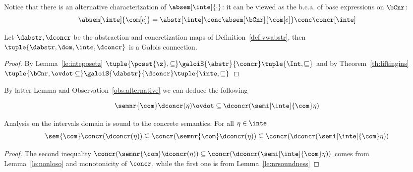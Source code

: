 \begin{observation}\label{obs:alternative}
  Notice that there is an alternative characterization of
  \(\absem[\inte]{\cdot}\): it can be viewed as the b.c.a. of base
  expressions on \(\bCnr\):
  \begin{equation*}
    \absem[\inte]{\com[e]} = \abstr[\inte] \conc \absem[\bCnr]{\com[e]} \conc \concr[\inte]
  \end{equation*}
\end{observation}

\begin{lemma}
  Let \(\dabstr, \dconcr\) be the abstraction and concretization maps
  of Definition~\ref{def:vwabstr}, then
  \(\tuple{\dabstr, \dom, \inte, \dconcr}\) is a Galois connection.
\end{lemma}

\begin{proof}
  By Lemma~\ref{le:inteposetz}
  \(\tuple{\poset{\z}, \subseteq} \galoiS{\abstr}{\concr} \tuple{\Int,
    \sqsubseteq}\) and by Theorem~\ref{th:liftingins}
  \(\tuple{\bCnr, \ovdot\subseteq} \galoiS{\dabstr}{\dconcr}
  \tuple{\inte, \sqsubseteq}\)
\end{proof}

By latter Lemma and Observation~\ref{obs:alternative} we can deduce
the following

\begin{lemma}\label{le:nonloso}
  \begin{equation*}
    \semnr{\com}\dconcr(\eta) \ovdot\subseteq \dconcr(\semi[\inte]{\com}\eta)
  \end{equation*}
\end{lemma}

\begin{observation}
  Analysis on the intervals domain is sound to the concrete
  semantics. For all \(\eta\in\inte\)
  \begin{equation*}
    \sem{\com}\concr(\dconcr(\eta)) \subseteq \concr(\semnr{\com}\dconcr(\eta)) \subseteq \concr(\dconcr(\semi[\inte]{\com}\eta))
  \end{equation*}
\end{observation}

\begin{proof}
  The second inequality
  \(\concr(\semnr{\com}\dconcr(\eta)) \subseteq
  \concr(\dconcr(\semi[\inte]{\com}\eta))\) comes from
  Lemma~\ref{le:nonloso} and monotonicity of \(\concr\), while the
  first one is from Lemma~\ref{le:nrsoundness}
\end{proof}
  
